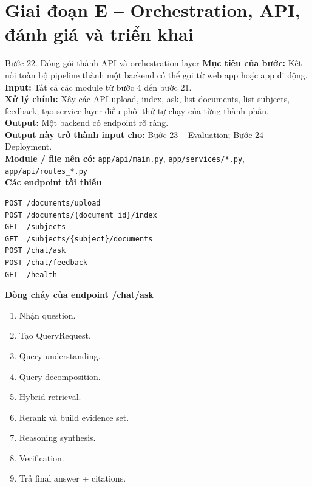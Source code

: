 \documentclass[12pt,a4paper]{article}
\newcommand{\stepgoal}[1]{\textbf{Mục tiêu của bước:} #1\\}
\newcommand{\stepinput}[1]{\textbf{Input:} #1\\}
\newcommand{\stepprocess}[1]{\textbf{Xử lý chính:} #1\\}
\newcommand{\stepoutput}[1]{\textbf{Output:} #1\\}
\newcommand{\stepnext}[1]{\textbf{Output này trở thành input cho:} #1\\}
\newcommand{\stepmodules}[1]{\textbf{Module / file nên có:} #1\\}
\begin{document}
\section{Giai đoạn E -- Orchestration, API, đánh giá và triển khai}

\begin{stepbox}{Bước 22. Đóng gói thành API và orchestration layer}
\stepgoal{Kết nối toàn bộ pipeline thành một backend có thể gọi từ web app hoặc app di động.}
\stepinput{Tất cả các module từ bước 4 đến bước 21.}
\stepprocess{Xây các API upload, index, ask, list documents, list subjects, feedback; tạo service layer điều phối thứ tự chạy của từng thành phần.}
\stepoutput{Một backend có endpoint rõ ràng.}
\stepnext{Bước 23 -- Evaluation; Bước 24 -- Deployment.}
\stepmodules{\texttt{app/api/main.py}, \texttt{app/services/*.py}, \texttt{app/api/routes\_*.py}}

\textbf{Các endpoint tối thiểu}
\begin{lstlisting}
POST /documents/upload
POST /documents/{document_id}/index
GET  /subjects
GET  /subjects/{subject}/documents
POST /chat/ask
POST /chat/feedback
GET  /health
\end{lstlisting}

\textbf{Dòng chảy của endpoint /chat/ask}
\begin{enumerate}[label=\arabic*.]
    \item Nhận question.
    \item Tạo QueryRequest.
    \item Query understanding.
    \item Query decomposition.
    \item Hybrid retrieval.
    \item Rerank và build evidence set.
    \item Reasoning synthesis.
    \item Verification.
    \item Trả final answer + citations.
\end{enumerate}
\end{stepbox}
\end{document}
